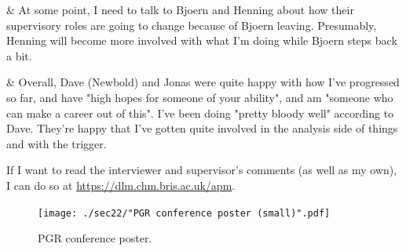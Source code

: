 \begin{easylist}[itemize]
& At some point, I need to talk to Bjoern and Henning about how their supervisory roles are going to change because of Bjoern leaving. Presumably, Henning will become more involved with what I'm doing while Bjoern steps back a bit.

& Overall, Dave (Newbold) and Jonas were quite happy with how I've progressed so far, and have "high hopes for someone of your ability", and am "someone who can make a career out of this". I've been doing "pretty bloody well" according to Dave. They're happy that I've gotten quite involved in the analysis side of things and with the trigger.

\end{easylist}

If I want to read the interviewer and supervisor's comments (as well as my own), I can do so at \url{https://dlm.chm.bris.ac.uk/apm}.

\clearpage
\begin{figure}[htbp]
    \centering
    \texttt{[image: ./sec22/"PGR conference poster (small)".pdf]}
    \caption{PGR conference poster.}
\end{figure}
